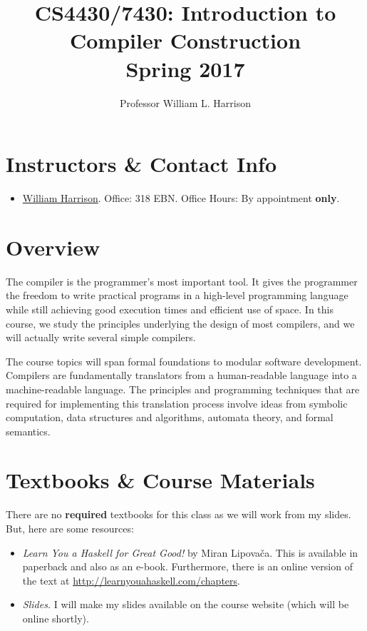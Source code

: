 \documentclass[11pt]{article}
\title{CS4430/7430: Introduction to Compiler Construction\\Spring 2017}
\author{Professor William L. Harrison}
\begin{document}
\maketitle

\section{Instructors \& Contact Info}

\begin{itemize}

\item  \href{mailto:harrisonwl@missouri.edu}{William Harrison}. Office: 318 EBN. Office Hours: By appointment {\bf only}.

\end{itemize}


\section{Overview}
The compiler is the programmer's most important tool. It gives the programmer the freedom to write practical programs in a high-level programming language while still achieving good execution times and efficient use of space. In this course, we study the principles underlying the design of most compilers, and we will actually write several simple compilers. 


The course topics will span formal foundations to modular software development. Compilers are fundamentally translators from a human-readable language into a machine-readable language. The principles and programming techniques that are required for implementing this translation process involve ideas from symbolic computation, data structures and algorithms, automata theory, and formal semantics.

\section{Textbooks \& Course Materials}

There are no {\bf{required}} textbooks for this class as we will work from my slides. But, here are some resources:
\begin{itemize}


\item {\it Learn You a Haskell for Great Good!} by Miran Lipova\v{c}a. This is available in  paperback and also as an e-book. Furthermore,  there is an online version of the text at \url{http://learnyouahaskell.com/chapters}. 

\item {\it Slides.} I will make my slides available on the course website (which will be online shortly). 
\end{itemize}
\end{document}
